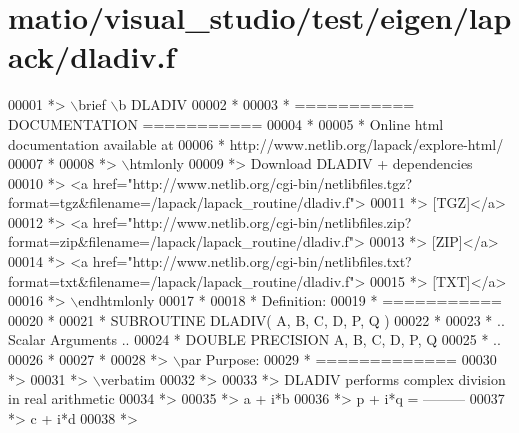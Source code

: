 \hypertarget{matio_2visual__studio_2test_2eigen_2lapack_2dladiv_8f_source}{}\section{matio/visual\+\_\+studio/test/eigen/lapack/dladiv.f}
\label{matio_2visual__studio_2test_2eigen_2lapack_2dladiv_8f_source}

\begin{DoxyCode}
00001 \textcolor{comment}{*> \(\backslash\)brief \(\backslash\)b DLADIV}
00002 \textcolor{comment}{*}
00003 \textcolor{comment}{*  =========== DOCUMENTATION ===========}
00004 \textcolor{comment}{*}
00005 \textcolor{comment}{* Online html documentation available at }
00006 \textcolor{comment}{*            http://www.netlib.org/lapack/explore-html/ }
00007 \textcolor{comment}{*}
00008 \textcolor{comment}{*> \(\backslash\)htmlonly}
00009 \textcolor{comment}{*> Download DLADIV + dependencies }
00010 \textcolor{comment}{*> <a
       href="http://www.netlib.org/cgi-bin/netlibfiles.tgz?format=tgz&filename=/lapack/lapack\_routine/dladiv.f"> }
00011 \textcolor{comment}{*> [TGZ]</a> }
00012 \textcolor{comment}{*> <a
       href="http://www.netlib.org/cgi-bin/netlibfiles.zip?format=zip&filename=/lapack/lapack\_routine/dladiv.f"> }
00013 \textcolor{comment}{*> [ZIP]</a> }
00014 \textcolor{comment}{*> <a
       href="http://www.netlib.org/cgi-bin/netlibfiles.txt?format=txt&filename=/lapack/lapack\_routine/dladiv.f"> }
00015 \textcolor{comment}{*> [TXT]</a>}
00016 \textcolor{comment}{*> \(\backslash\)endhtmlonly }
00017 \textcolor{comment}{*}
00018 \textcolor{comment}{*  Definition:}
00019 \textcolor{comment}{*  ===========}
00020 \textcolor{comment}{*}
00021 \textcolor{comment}{*       SUBROUTINE DLADIV( A, B, C, D, P, Q )}
00022 \textcolor{comment}{* }
00023 \textcolor{comment}{*       .. Scalar Arguments ..}
00024 \textcolor{comment}{*       DOUBLE PRECISION   A, B, C, D, P, Q}
00025 \textcolor{comment}{*       ..}
00026 \textcolor{comment}{*  }
00027 \textcolor{comment}{*}
00028 \textcolor{comment}{*> \(\backslash\)par Purpose:}
00029 \textcolor{comment}{*  =============}
00030 \textcolor{comment}{*>}
00031 \textcolor{comment}{*> \(\backslash\)verbatim}
00032 \textcolor{comment}{*>}
00033 \textcolor{comment}{*> DLADIV performs complex division in  real arithmetic}
00034 \textcolor{comment}{*>}
00035 \textcolor{comment}{*>                       a + i*b}
00036 \textcolor{comment}{*>            p + i*q = ---------}
00037 \textcolor{comment}{*>                       c + i*d}
00038 \textcolor{comment}{*>}

\end{DoxyCode}
